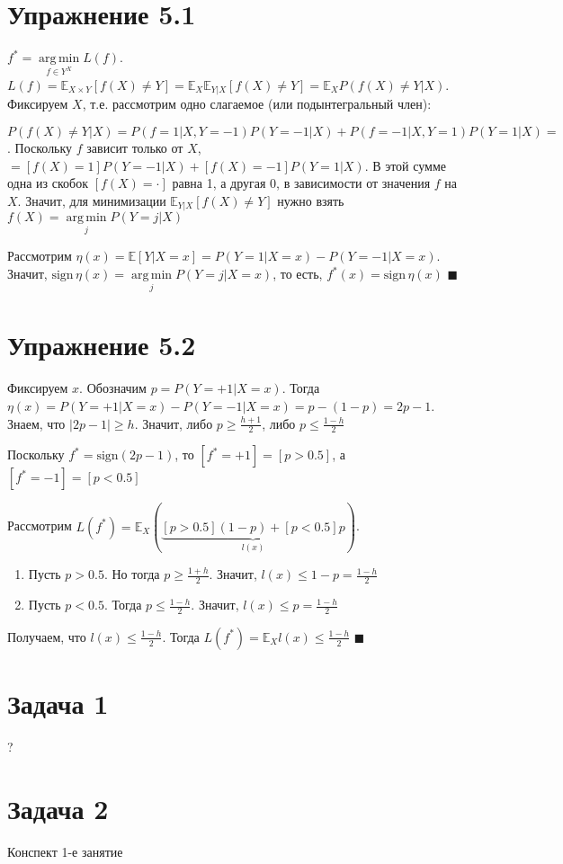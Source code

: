 \documentclass[a4paper]{article}
\DeclareMathOperator*{\argmin}{arg\,min}
\begin{document}
\section*{Упражнение 5.1}
$f^*=\argmin\limits_{f\in Y^X} L(f)$. $L(f)=\mathbb{E}_{X\times Y}[f(X)\neq Y]=\mathbb{E}_X\mathbb{E}_{Y|X}[f(X)\neq Y]=\mathbb{E}_X P(f(X)\neq Y\big| X)$. Фиксируем $X$, т.е. рассмотрим одно слагаемое (или подынтегральный член):

$P(f(X)\neq Y\big|X)=P(f=1\big| X,Y=-1)P(Y=-1\big|X)+P(f=-1\big| X,Y=1)P(Y=1\big|X)\boxed{=}$. Поскольку $f$ зависит только от $X$, $\boxed{=}[f(X)=1]P(Y=-1\big|X)+[f(X)=-1]P(Y=1\big|X)$. В этой сумме одна из скобок $[f(X)=\cdot]$ равна 1, а другая 0, в зависимости от значения $f$ на $X$. Значит, для минимизации $\mathbb{E}_{Y|X}[f(X)\neq Y]$ нужно взять $f(X)=\argmin\limits_j P(Y=j\big|X)$

Рассмотрим $\eta(x)=\mathbb{E}[Y|X=x]=P(Y=1\big|X=x)-P(Y=-1\big| X=x)$. Значит, $\mbox{sign}\,\eta(x)=\argmin\limits_j P(Y=j\big| X=x)$, то есть, $f^*(x)=\mbox{sign}\,\eta(x)$ $\blacksquare$
\section*{Упражнение 5.2}
Фиксируем $x$. Обозначим $p=P(Y=+1|X=x)$. Тогда $\eta(x)=P(Y=+1|X=x)-P(Y=-1|X=x)=p-(1-p)=2p-1$. Знаем, что $|2p-1|\geqslant h$. Значит, либо $p\geqslant\frac{h+1}{2}$, либо $p\leqslant \frac{1-h}{2}$

Поскольку $f^*=\mbox{sign}(2p-1)$, то $[f^*=+1]=[p>0.5]$, а $[f^*=-1]=[p<0.5]$

Рассмотрим $L(f^*)=\mathbb{E}_X\left(\underbrace{[p>0.5](1-p)+[p<0.5]p}_{l(x)}\right)$.

\begin{enumerate}
\item Пусть $p>0.5$. Но тогда $p\geqslant \frac{1+h}{2}$. Значит, $l(x)\leqslant 1-p=\frac{1-h}{2}$
\item Пусть $p<0.5$. Тогда $p\leqslant \frac{1-h}{2}$. Значит, $l(x)\leqslant p=\frac{1-h}{2}$
\end{enumerate}

Получаем, что $l(x)\leqslant \frac{1-h}{2}$. Тогда $L(f^*)=\mathbb{E}_Xl(x)\leqslant \frac{1-h}{2}$ $\blacksquare$
\section*{Задача 1}
?
\section*{Задача 2}
Конспект 1-е занятие
\end{document}
